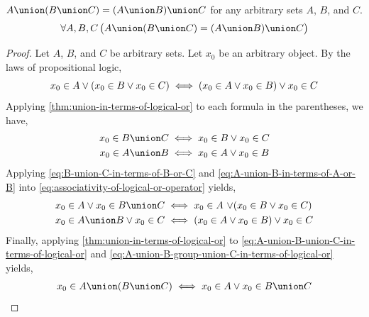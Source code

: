 \begin{thm}[Associativity]
    \label{set-identities:associativity-of-unions}
    \( A \union \mleft( B \union C \mright) = \mleft( A \union B \mright) \union C \) for any arbitrary sets \( A \), \( B \), and \( C \).
    \begin{equation*}
        \forall A,B,C \, \big( A \union \mleft( B \union C \mright) = \mleft( A \union B \mright) \union C \big)
    \end{equation*}
\end{thm}

\begin{proof}
    Let \( A \), \( B \), and \( C \) be arbitrary sets. Let \( x_{0} \) be an arbitrary object. By the laws of propositional logic,
    \begin{equation}
        \label{eq:associativity-of-logical-or-operator}
        x_{0} \in A \lor \mleft( x_{0} \in B \lor x_{0} \in C \mright)
        \iff
        \mleft( x_{0} \in A \lor x_{0} \in B \mright) \lor x_{0} \in C
    \end{equation}
    Applying \cref{thm:union-in-terms-of-logical-or} to each formula in the parentheses, we have,
    \begin{align}
        x_{0} \in B \union C &\iff x_{0} \in B \lor x_{0} \in C
        \label{eq:B-union-C-in-terms-of-B-or-C} \\
        x_{0} \in A \union B &\iff x_{0} \in A \lor x_{0} \in B
        \label{eq:A-union-B-in-terms-of-A-or-B}
    \end{align}
    Applying \eqref{eq:B-union-C-in-terms-of-B-or-C} and \eqref{eq:A-union-B-in-terms-of-A-or-B}
    into \eqref{eq:associativity-of-logical-or-operator} yields,
    \begin{align}
        x_{0} \in A \lor x_{0} \in B \union C &\iff
        x_{0} \in A \,\,{\lor} \mleft( x_{0} \in B \lor x_{0} \in C \mright)
        \label{eq:A-union-B-union-C-in-terms-of-logical-or}\\
        x_{0} \in A \union B \lor x_{0} \in C &\iff
        \mleft( x_{0} \in A \lor x_{0} \in B \mright) \lor x_{0} \in C
        \label{eq:A-union-B-group-union-C-in-terms-of-logical-or}
    \end{align}
    Finally, applying \cref{thm:union-in-terms-of-logical-or} to \eqref{eq:A-union-B-union-C-in-terms-of-logical-or}
    and \eqref{eq:A-union-B-group-union-C-in-terms-of-logical-or} yields,
    \begin{align*}
        x_{0} \in A \union \mleft( B \union C \mright)
        &\iff
        x_{0} \in A \lor x_{0} \in B \union C\\

\end{align*}
\end{proof}
